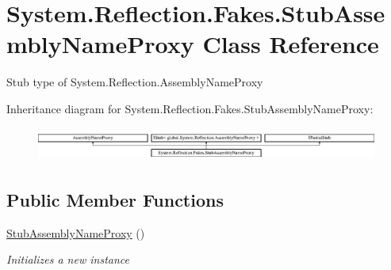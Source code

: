 \hypertarget{class_system_1_1_reflection_1_1_fakes_1_1_stub_assembly_name_proxy}{\section{System.\-Reflection.\-Fakes.\-Stub\-Assembly\-Name\-Proxy Class Reference}
\label{class_system_1_1_reflection_1_1_fakes_1_1_stub_assembly_name_proxy}
}


Stub type of System.\-Reflection.\-Assembly\-Name\-Proxy 


Inheritance diagram for System.\-Reflection.\-Fakes.\-Stub\-Assembly\-Name\-Proxy\-:\begin{figure}[H]
\begin{center}
\leavevmode
\includegraphics[height=1.121121cm]{class_system_1_1_reflection_1_1_fakes_1_1_stub_assembly_name_proxy}
\end{center}
\end{figure}
\subsection*{Public Member Functions}
\begin{DoxyCompactItemize}
\item 
\hyperlink{class_system_1_1_reflection_1_1_fakes_1_1_stub_assembly_name_proxy_abef6c56f8377ab98d8011f21e80c2975}{Stub\-Assembly\-Name\-Proxy} ()
\begin{DoxyCompactList}\small\item\em Initializes a new instance\end{DoxyCompactList}\end{DoxyCompactItemize}

